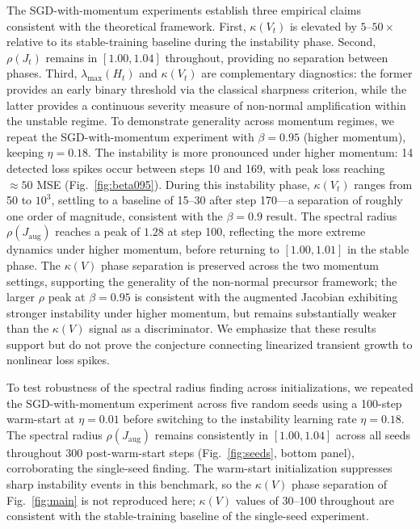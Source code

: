 \documentclass[aps,prresearch,twocolumn,superscriptaddress,longbibliography]{revtex4-2}
\begin{document}
The SGD-with-momentum experiments establish three empirical claims
consistent with the theoretical framework.
First, $\kappa(V_t)$ is elevated by $5$--$50\times$ relative to its
stable-training baseline during the instability phase.
Second, $\rho(J_t)$ remains in $[1.00, 1.04]$ throughout, providing no
separation between phases.
Third, $\lambda_{\max}(H_t)$ and $\kappa(V_t)$ are complementary
diagnostics: the former provides an early binary threshold via the
classical sharpness criterion, while the latter provides a continuous
severity measure of non-normal amplification within the unstable regime.
To demonstrate generality across momentum regimes, we repeat the
SGD-with-momentum experiment with $\beta = 0.95$ (higher momentum),
keeping $\eta = 0.18$.
The instability is more pronounced under higher momentum: 14 detected
loss spikes occur between steps 10 and 169, with peak loss reaching
$\approx 50$ MSE (Fig.~\ref{fig:beta095}).
During this instability phase, $\kappa(V_t)$ ranges from 50 to $10^3$,
settling to a baseline of 15--30 after step 170---a separation of
roughly one order of magnitude, consistent with the $\beta = 0.9$
result.
The spectral radius $\rho(J_\mathrm{aug})$ reaches a peak of $1.28$
at step 100, reflecting the more extreme dynamics under higher momentum,
before returning to $[1.00, 1.01]$ in the stable phase.
The $\kappa(V)$ phase separation is preserved across the two momentum
settings, supporting the generality of the non-normal precursor
framework; the larger $\rho$ peak at $\beta=0.95$ is consistent with
the augmented Jacobian exhibiting stronger instability under higher
momentum, but remains substantially weaker than the $\kappa(V)$ signal
as a discriminator. We emphasize that these results support but do not prove the conjecture
connecting linearized transient growth to nonlinear loss spikes.

To test robustness of the spectral radius finding across initializations,
we repeated the SGD-with-momentum experiment across five random seeds
using a 100-step warm-start at $\eta=0.01$ before switching to the
instability learning rate $\eta=0.18$.
The spectral radius $\rho(J_\mathrm{aug})$ remains consistently in
$[1.00, 1.04]$ across all seeds throughout 300 post-warm-start steps
(Fig.~\ref{fig:seeds}, bottom panel), corroborating the single-seed
finding.
The warm-start initialization suppresses sharp instability events in
this benchmark, so the $\kappa(V)$ phase separation of Fig.~\ref{fig:main}
is not reproduced here; $\kappa(V)$ values of 30--100 throughout are
consistent with the stable-training baseline of the single-seed
experiment.
\end{document}
